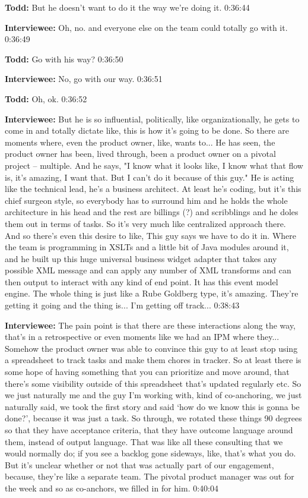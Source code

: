 \textbf{Todd:}  	But he doesn't want to do it the way we're doing it.  0:36:44

\textbf{Interviewee:}	Oh, no. and everyone else on the team could totally go with it.  0:36:49

\textbf{Todd:}  	Go with his way?  0:36:50

\textbf{Interviewee:}  	No, go with our way.  0:36:51

\textbf{Todd:}  	Oh, ok.  0:36:52

\textbf{Interviewee:}  	But he is so influential, politically, like organizationally, he gets to come in and totally dictate like, this is how it's going to be done.  So there are moments where, even the product owner, like, wants to...  He has seen, the product owner has been, lived through, been a product owner on a pivotal project – multiple.  And he says, "I know what it looks like, I know what that flow is, it's amazing, I want that.  But I can't do it because of this guy."  He is acting like the technical lead, he's a business architect.  At least he's coding, but it's this chief surgeon style, so  everybody has to surround him and he holds the whole architecture in his head and the rest are billings (?) and scribblings and he doles them out in terms of tasks.  So it's very much like centralized approach there. And so there's even this desire to like,   This guy says we have to do it in.  Where the team is programming in XSLTs and a little bit of Java modules around it, and he built up this huge universal business widget adapter that takes any possible XML message and can apply any number of XML transforms and can then output to interact with any kind of end point.  It has this event model engine.  The whole thing is just like a Rube Goldberg type, it's amazing.  They're getting it going and the thing is... I'm getting off track...   0:38:43

\textbf{Interviewee:}   The pain point is that there are these interactions along the way, that's in a retrospective or even moments like we had an IPM where they...  Somehow the product owner was able to convince this guy to at least stop using a spreadsheet to track tasks and make them chores in tracker. So at least there is some hope of having something that you can prioritize and move around, that there's some visibility outside of this spreadsheet that's updated regularly etc.  So we just naturally me and the guy I'm working with, kind of co-anchoring, we just naturally said, we took the first story and said ‘how do we know this is gonna be done?', because it was just a task.  So through, we rotated these things 90 degrees so that they have acceptance criteria, that they have outcome language around them, instead of output language.  That was like all these consulting that we would normally do; if you see a backlog gone sideways, like, that's what you do. But it's unclear whether or not that was actually part of our engagement, because, they're like a separate team.  The pivotal product manager was out for the week and so as co-anchors, we filled in for him.  0:40:04

